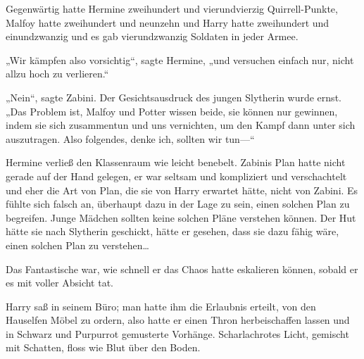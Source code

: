 Gegenwärtig hatte Hermine zweihundert und vierundvierzig Quirrell-Punkte, Malfoy hatte zweihundert und neunzehn und Harry hatte zweihundert und einundzwanzig und es gab vierundzwanzig Soldaten in jeder Armee.

„Wir kämpfen also vorsichtig“, sagte Hermine, „und versuchen einfach nur, nicht allzu hoch zu verlieren.“

„Nein“, sagte Zabini. Der Gesichtsausdruck des jungen Slytherin wurde ernst. „Das Problem ist, Malfoy und Potter wissen beide, sie können nur gewinnen, indem sie sich zusammentun und uns vernichten, um den Kampf dann unter sich auszutragen. Also folgendes, denke ich, sollten wir tun—“

Hermine verließ den Klassenraum wie leicht benebelt. Zabinis Plan hatte nicht gerade auf der Hand gelegen, er war seltsam und kompliziert und verschachtelt und eher die Art von Plan, die sie von Harry erwartet hätte, nicht von Zabini. Es fühlte sich falsch an, überhaupt dazu in der Lage zu sein, einen solchen Plan zu begreifen. Junge Mädchen sollten keine solchen Pläne verstehen können. Der Hut hätte sie nach Slytherin geschickt, hätte er gesehen, dass sie dazu fähig wäre, einen solchen Plan zu verstehen…

\later

Das Fantastische war, wie schnell er das Chaos hatte eskalieren können, sobald er es mit voller Absicht tat.

Harry saß in seinem Büro; man hatte ihm die Erlaubnis erteilt, von den Hauselfen Möbel zu ordern, also hatte er einen Thron herbeischaffen lassen und in Schwarz und Purpurrot gemusterte Vorhänge. Scharlachrotes Licht, gemischt mit Schatten, floss wie Blut über den Boden.

